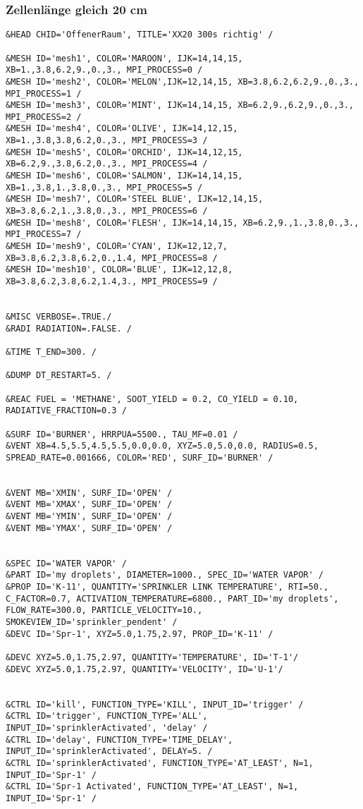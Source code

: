 \subsubsection{Zellenlänge gleich 20 cm}
\begin{lstlisting}[emptylines=0,basicstyle=\tiny]
&HEAD CHID='OffenerRaum', TITLE='XX20 300s richtig' /

&MESH ID='mesh1', COLOR='MAROON', IJK=14,14,15, XB=1.,3.8,6.2,9.,0.,3., MPI_PROCESS=0 /
&MESH ID='mesh2', COLOR='MELON',IJK=12,14,15, XB=3.8,6.2,6.2,9.,0.,3., MPI_PROCESS=1 /
&MESH ID='mesh3', COLOR='MINT', IJK=14,14,15, XB=6.2,9.,6.2,9.,0.,3., MPI_PROCESS=2 /
&MESH ID='mesh4', COLOR='OLIVE', IJK=14,12,15, XB=1.,3.8,3.8,6.2,0.,3., MPI_PROCESS=3 /
&MESH ID='mesh5', COLOR='ORCHID', IJK=14,12,15, XB=6.2,9.,3.8,6.2,0.,3., MPI_PROCESS=4 /
&MESH ID='mesh6', COLOR='SALMON', IJK=14,14,15, XB=1.,3.8,1.,3.8,0.,3., MPI_PROCESS=5 /
&MESH ID='mesh7', COLOR='STEEL BLUE', IJK=12,14,15, XB=3.8,6.2,1.,3.8,0.,3., MPI_PROCESS=6 /
&MESH ID='mesh8', COLOR='FLESH', IJK=14,14,15, XB=6.2,9.,1.,3.8,0.,3., MPI_PROCESS=7 /
&MESH ID='mesh9', COLOR='CYAN', IJK=12,12,7, XB=3.8,6.2,3.8,6.2,0.,1.4, MPI_PROCESS=8 /
&MESH ID='mesh10', COLOR='BLUE', IJK=12,12,8, XB=3.8,6.2,3.8,6.2,1.4,3., MPI_PROCESS=9 /


&MISC VERBOSE=.TRUE./
&RADI RADIATION=.FALSE. /

&TIME T_END=300. /

&DUMP DT_RESTART=5. /

&REAC FUEL = 'METHANE', SOOT_YIELD = 0.2, CO_YIELD = 0.10, RADIATIVE_FRACTION=0.3 /

&SURF ID='BURNER', HRRPUA=5500., TAU_MF=0.01 /
&VENT XB=4.5,5.5,4.5,5.5,0.0,0.0, XYZ=5.0,5.0,0.0, RADIUS=0.5, SPREAD_RATE=0.001666, COLOR='RED', SURF_ID='BURNER' /


&VENT MB='XMIN', SURF_ID='OPEN' /  
&VENT MB='XMAX', SURF_ID='OPEN' /  
&VENT MB='YMIN', SURF_ID='OPEN' /  
&VENT MB='YMAX', SURF_ID='OPEN' / 

 
&SPEC ID='WATER VAPOR' /
&PART ID='my droplets', DIAMETER=1000., SPEC_ID='WATER VAPOR' /
&PROP ID='K-11', QUANTITY='SPRINKLER LINK TEMPERATURE', RTI=50., C_FACTOR=0.7, ACTIVATION_TEMPERATURE=6800., PART_ID='my droplets', FLOW_RATE=300.0, PARTICLE_VELOCITY=10., SMOKEVIEW_ID='sprinkler_pendent' /
&DEVC ID='Spr-1', XYZ=5.0,1.75,2.97, PROP_ID='K-11' /

&DEVC XYZ=5.0,1.75,2.97, QUANTITY='TEMPERATURE', ID='T-1'/
&DEVC XYZ=5.0,1.75,2.97, QUANTITY='VELOCITY', ID='U-1'/


&CTRL ID='kill', FUNCTION_TYPE='KILL', INPUT_ID='trigger' /
&CTRL ID='trigger', FUNCTION_TYPE='ALL', INPUT_ID='sprinklerActivated', 'delay' /
&CTRL ID='delay', FUNCTION_TYPE='TIME_DELAY', INPUT_ID='sprinklerActivated', DELAY=5. /
&CTRL ID='sprinklerActivated', FUNCTION_TYPE='AT_LEAST', N=1, INPUT_ID='Spr-1' /
&CTRL ID='Spr-1 Activated', FUNCTION_TYPE='AT_LEAST', N=1, INPUT_ID='Spr-1' /




\end{lstlisting}
